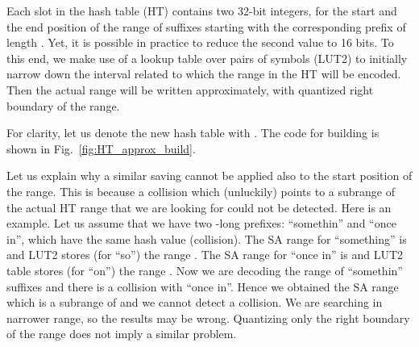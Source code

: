 \documentclass{cai}
\begin{document}
Each slot in the hash table (HT) contains two 32-bit integers, 
for the start and the end position of the range of suffixes starting 
with the corresponding prefix of length .
Yet, it is possible in practice to reduce the second value to 16 bits.
To this end, we make use of a lookup table over 
pairs of symbols (LUT2)
to initially narrow down the interval related to which the range in the HT 
will be encoded.
Then the actual range will be written approximately, with quantized
right boundary of the range.

For clarity, let us denote the new hash table with . 
The code for building  
is shown in Fig.~\ref{fig:HT_approx_build}.

Let us explain why a similar saving cannot be applied also to the 
start position of the range.
This is because a collision which (unluckily) points to a subrange of 
the actual HT range that we are looking for could not be detected.
Here is an example.
Let us assume that we have two -long prefixes: 
``somethin'' and ``once in'', which have the same hash value (collision).
The SA range for ``something'' is  and 
LUT2 stores (for ``so'') the range .
The SA range for ``once in'' is  and 
LUT2 table stores (for ``on'') the range .
Now we are decoding the range of ``somethin'' suffixes and 
there is a collision with ``once in''. 
Hence we obtained the SA range  which is a subrange of 
 and we cannot detect a collision. 
We are searching in narrower range, so the results may be wrong.
Quantizing only the right boundary of the range does not imply 
a similar problem.
\end{document}
